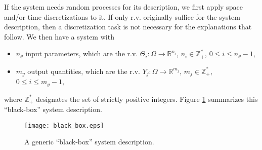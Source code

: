 If the system needs random processes for its description, we first apply space and/or time discretizations to it. 
If only r.v. originally suffice for the system description, then a discretization task is not necessary for the explanations that follow.
We then have a system with
\begin{itemize}
\item $n_{\theta}$ input parameters, which are the r.v. $\Theta_i:\Omega\rightarrow\mathbb{R}^{n_i}$, $n_i\in\mathbb{Z}_+^*$, $0\leqslant i\leqslant n_{\theta}-1$,
\item $m_{y}$ output quantities, which are the r.v. $Y_j:\Omega\rightarrow\mathbb{R}^{m_j}$, $m_j\in\mathbb{Z}_+^*$, $0\leqslant i\leqslant m_{y}-1$,
\end{itemize}
where $\mathbb{Z}_+^*$ designates the set of strictly positive integers.
Figure \ref{fig-black-box} summarizes this ``black-box'' system description.

\begin{figure}%
\begin{center}
\texttt{[image: black\_box.eps]}
\end{center}
\caption{A generic ``black-box'' system description.
}
\label{fig-black-box}
\end{figure}

